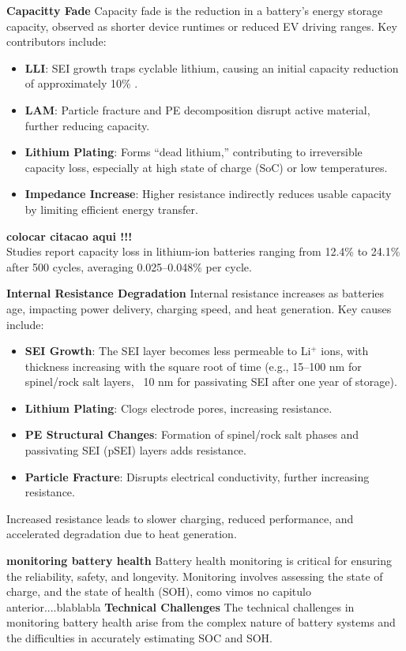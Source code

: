 \textbf{Capacitty Fade}
Capacity fade is the reduction in a battery's energy storage capacity, observed as shorter device runtimes or reduced EV driving ranges. Key contributors include:

\begin{itemize}
    \item \textbf{LLI}: SEI growth traps cyclable lithium, causing an initial capacity reduction of approximately 10\% .
    \item \textbf{LAM}: Particle fracture and PE decomposition disrupt active material, further reducing capacity.
    \item \textbf{Lithium Plating}: Forms ``dead lithium,'' contributing to irreversible capacity loss, especially at high state of charge (SoC) or low temperatures.
    \item \textbf{Impedance Increase}: Higher resistance indirectly reduces usable capacity by limiting efficient energy transfer.
\end{itemize}

\textbf{colocar citacao aqui !!!} \\
Studies report capacity loss in lithium-ion batteries ranging from 12.4\% to 24.1\% after 500 cycles, averaging 0.025--0.048\% per cycle.

\textbf{Internal Resistance Degradation}
Internal resistance increases as batteries age, impacting power delivery, charging speed, and heat generation. Key causes include:

\begin{itemize}
    \item \textbf{SEI Growth}: The SEI layer becomes less permeable to Li$^+$ ions, with thickness increasing with the square root of time (e.g., 15--100 nm for spinel/rock salt layers, ~10 nm for passivating SEI after one year of storage).
    \item \textbf{Lithium Plating}: Clogs electrode pores, increasing resistance.
    \item \textbf{PE Structural Changes}: Formation of spinel/rock salt phases and passivating SEI (pSEI) layers adds resistance.
    \item \textbf{Particle Fracture}: Disrupts electrical conductivity, further increasing resistance.
\end{itemize}
Increased resistance leads to slower charging, reduced performance, and accelerated degradation due to heat generation.


\textbf{monitoring battery health}
Battery health monitoring is critical for ensuring the reliability, safety, and longevity. Monitoring involves assessing the state of charge,
and the state of health (SOH),
como vimos no capitulo anterior....blablabla
\textbf{Technical Challenges}
The technical challenges in monitoring battery health arise from the complex nature of battery systems and the difficulties in accurately estimating SOC and SOH.

